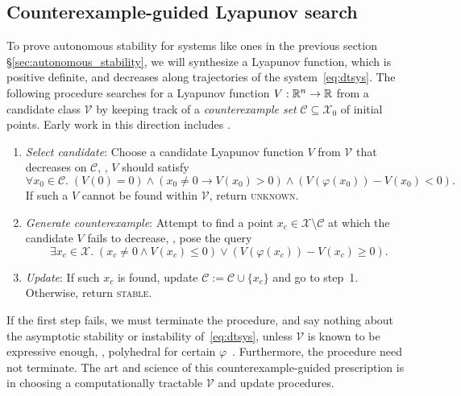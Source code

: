 \documentclass[10pt]{article}
\newcommand{\amn}{\varphi}
\theoremstyle{remark}
\theoremstyle{definition}
\theoremstyle{plain}
\begin{document}
\subsection{Counterexample-guided {L}yapunov search}
To prove autonomous stability for systems like ones in the previous section
\S\ref{sec:autonomous_stability}, we will synthesize a Lyapunov function, which
is positive definite, and decreases along trajectories of the
system~\eqref{eq:dtsys}.
The following procedure searches for a Lyapunov function $V:\mathbb{R}^n\to\mathbb{R}$
from a candidate class $\mathcal{V}$ by keeping track of a \emph{counterexample
set} $\mathcal{C}\subseteq\mathcal{X}_0$ of initial points.
Early work in this direction includes \cite{Cheng:2013,Kapinski:2014,Ravanbakhsh:2015}.

\begin{enumerate}
	\item \label{enum:candidate} \emph{Select candidate}: Choose a candidate
	Lyapunov function $V$ from $\mathcal{V}$ that decreases on $\mathcal{C}$,
	\ie, $V$ should satisfy
	\[
		\forall x_0 \in \mathcal{C} .\;
		(V(0) = 0) 
		\wedge (x_0 \neq 0 \rightarrow V(x_0) > 0)
		\wedge (V(\amn(x_0)) - V(x_0) < 0).
	\]
	If such a $V$ cannot be found within $\mathcal{V}$, return \textsc{unknown}.
	\item \label{enum:counterexample} \emph{Generate counterexample}: Attempt
	to find a point $x_c\in\mathcal{X}\setminus\mathcal{C}$ at which the
	candidate $V$ fails to decrease, \ie, pose the query
	\[
		\exists x_c \in\mathcal{X} .\;
		(x_c \neq 0 \wedge V(x_c) \leq 0) 
		\vee
		(V(\amn(x_c)) - V(x_c) \geq 0).
	\]
	\item \label{enum:update} \emph{Update}: If such $x_c$ is found, update
	$\mathcal{C}:=\mathcal{C}\cup\{x_c\}$ and go to step~1. Otherwise, return
	\textsc{stable}.
\end{enumerate}

If the first step fails, we must terminate the procedure, and say nothing about
the asymptotic stability or instability of~\eqref{eq:dtsys}, unless
$\mathcal{V}$ is known to be expressive enough, \eg, polyhedral for certain
$\amn$~\cite{Bitsoris:1988}.
Furthermore, the procedure need not terminate.  The art and science of this
counterexample-guided prescription is in choosing a computationally tractable
$\mathcal{V}$ and update procedures.
\end{document}
